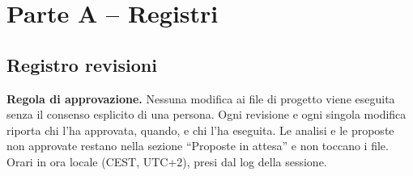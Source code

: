 \clearpage
\section[Parte A – Registri]{Parte A – Registri}

\subsection[Registro revisioni]{Registro revisioni}

\begin{notebox}
\textbf{Regola di approvazione.} Nessuna modifica ai file di progetto viene eseguita senza il consenso esplicito di una persona. Ogni revisione e ogni singola modifica riporta chi l'ha approvata, quando, e chi l'ha eseguita. Le analisi e le proposte non approvate restano nella sezione \textquotedblleft{}Proposte in attesa\textquotedblright{} e non toccano i file. Orari in ora locale (CEST, UTC+2), presi dal log della sessione.
\end{notebox}

